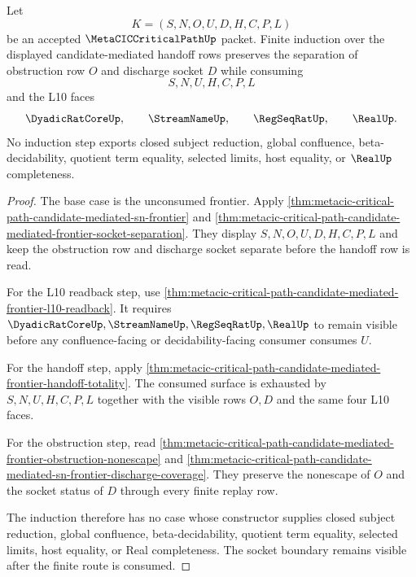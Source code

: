 \begin{theorem}
\label{thm:metacic-critical-path-candidate-mediated-sn-socket-induction-frontier}
Let
$$
K=(S,N,O,U,D,H,C,P,L)
$$
be an accepted $\MetaCICCriticalPathUp$ packet. Finite induction over the displayed candidate-mediated handoff rows preserves the separation of obstruction row $O$ and discharge socket $D$ while consuming
$$
S,N,U,H,C,P,L
$$
and the L10 faces
$$
\DyadicRatCoreUp,\qquad
\StreamNameUp,\qquad
\RegSeqRatUp,\qquad
\RealUp .
$$
No induction step exports closed subject reduction, global confluence, beta-decidability, quotient term equality, selected limits, host equality, or $\RealUp$ completeness.
\end{theorem}
\begin{proof}
The base case is the unconsumed frontier. Apply \autoref{thm:metacic-critical-path-candidate-mediated-sn-frontier} and \autoref{thm:metacic-critical-path-candidate-mediated-frontier-socket-separation}. They display $S,N,O,U,D,H,C,P,L$ and keep the obstruction row and discharge socket separate before the handoff row is read.

For the L10 readback step, use \autoref{thm:metacic-critical-path-candidate-mediated-frontier-l10-readback}. It requires $\DyadicRatCoreUp,\StreamNameUp,\RegSeqRatUp,\RealUp$ to remain visible before any confluence-facing or decidability-facing consumer consumes $U$.

For the handoff step, apply \autoref{thm:metacic-critical-path-candidate-mediated-frontier-handoff-totality}. The consumed surface is exhausted by $S,N,U,H,C,P,L$ together with the visible rows $O,D$ and the same four L10 faces.

For the obstruction step, read \autoref{thm:metacic-critical-path-candidate-mediated-frontier-obstruction-nonescape} and \autoref{thm:metacic-critical-path-candidate-mediated-sn-frontier-discharge-coverage}. They preserve the nonescape of $O$ and the socket status of $D$ through every finite replay row.

The induction therefore has no case whose constructor supplies closed subject reduction, global confluence, beta-decidability, quotient term equality, selected limits, host equality, or Real completeness. The socket boundary remains visible after the finite route is consumed.
\end{proof}


